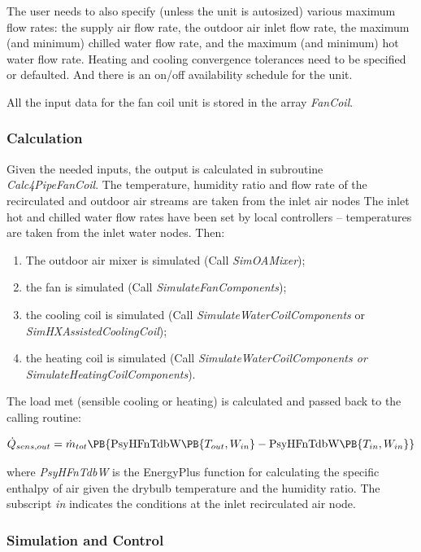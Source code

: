The user needs to also specify (unless the unit is autosized) various maximum flow rates: the supply air flow rate, the outdoor air inlet flow rate, the maximum (and minimum) chilled water flow rate, and the maximum (and minimum) hot water flow rate. Heating and cooling convergence tolerances need to be specified or defaulted. And there is an on/off availability schedule for the unit.

All the input data for the fan coil unit is stored in the array \emph{FanCoil}.

\subsubsection{Calculation}\label{calculation-3-000}

Given the needed inputs, the output is calculated in subroutine \emph{Calc4PipeFanCoil}. The temperature, humidity ratio and flow rate of the recirculated and outdoor air streams are taken from the inlet air nodes The inlet hot and chilled water flow rates have been set by local controllers -- temperatures are taken from the inlet water nodes. Then:

\begin{enumerate}
\item The outdoor air mixer is simulated (Call \emph{SimOAMixer});
\item the fan is simulated (Call \emph{SimulateFanComponents});
\item the cooling coil is simulated (Call \emph{SimulateWaterCoilComponents} or \emph{SimHXAssistedCoolingCoil});
\item the heating coil is simulated (Call \emph{SimulateWaterCoilComponents or SimulateHeatingCoilComponents}).
\end{enumerate}

The load met (sensible cooling or heating) is calculated and passed back to the calling routine:

\begin{equation}
  \dot{Q}_{sens,out} = \dot{m}_{tot} \PB{\text{PsyHFnTdbW}\PB{T_{out},W_{in}} - \text{PsyHFnTdbW}\PB{T_{in},W_{in}}}
\end{equation}

where \emph{PsyHFnTdbW} is the EnergyPlus function for calculating the specific enthalpy of air given the drybulb temperature and the humidity ratio. The subscript \emph{in} indicates the conditions at the inlet recirculated air node.

\subsubsection{Simulation and Control}\label{simulation-and-control-3-000}

